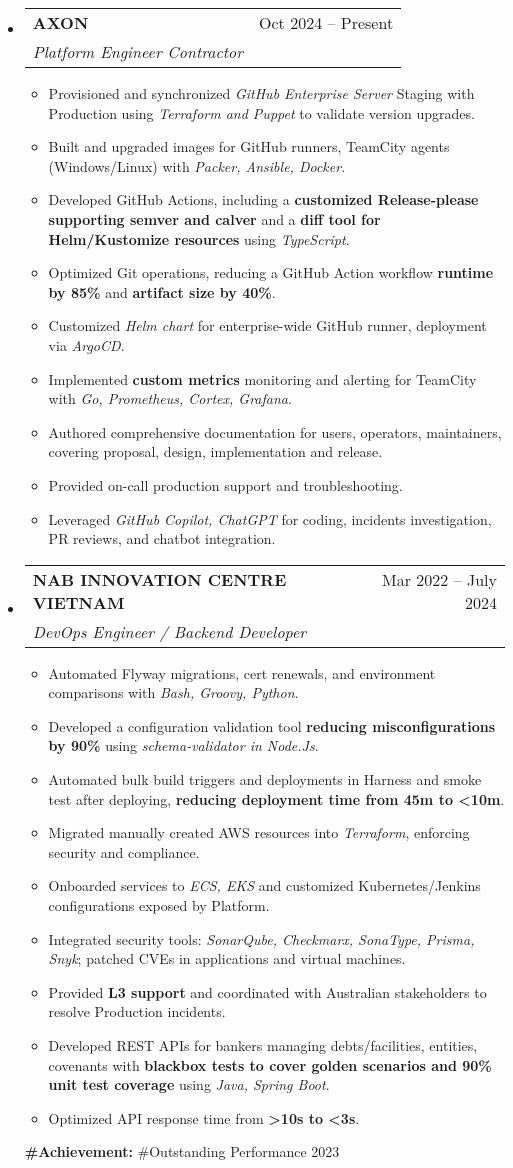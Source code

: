 \documentclass[letterpaper,12pt]{article}[leftmargin=*]
\makeatletter
\def \entryspacing {5pt}
\newcommand{\resumeEntryStart}{\begin{itemize}[leftmargin=2.5mm]}
\newcommand{\resumeEntryEnd}{\end{itemize}\vspace{\entryspacing}}
\newcommand{\resumeItemListStart}{\begin{itemize}[leftmargin=4.5mm]}
\newcommand{\resumeItemListEnd}{\end{itemize}}
\newcommand{\resumeItem}[1]{
  \item\small{
    {#1 \vspace{-2pt}}
  }
}
\newcommand{\resumeEntryTSDL}[4]{
  \vspace{-1pt}\item[]
    \begin{tabularx}{0.97\textwidth}{X@{\hspace{60pt}}r}
      \textbf{\color{primary}#1} & {\firabook\color{accent}\small#2} \\
      \textit{\color{accent}\small#3} & {\firabook\color{accent}\small#4} \\
    \end{tabularx}\vspace{-6pt}
}
\makeatother
\begin{document}
  \resumeEntryStart
    \resumeEntryTSDL
      {AXON}{Oct 2024 -- Present}
      {Platform Engineer Contractor}{}
    \resumeItemListStart
      \resumeItem {Provisioned and synchronized \textit{GitHub Enterprise Server} Staging with Production using \textit{Terraform and Puppet} to validate version upgrades.}
      \resumeItem {Built and upgraded images for GitHub runners, TeamCity agents (Windows/Linux) with \textit{Packer, Ansible, Docker}.}
      \resumeItem {Developed GitHub Actions, including a \textbf{customized Release-please supporting semver and calver} and a \textbf{diff tool for Helm/Kustomize resources} using \textit{TypeScript}.}
      \resumeItem {Optimized Git operations, reducing a GitHub Action workflow \textbf{runtime by 85\%} and \textbf{artifact size by 40\%}.}
      \resumeItem {Customized \textit{Helm chart} for enterprise-wide GitHub runner, deployment via \textit{ArgoCD}.}
      \resumeItem {Implemented \textbf{custom metrics} monitoring and alerting for TeamCity with \textit{Go, Prometheus, Cortex, Grafana}.}
      \resumeItem {Authored comprehensive documentation for users, operators, maintainers, covering proposal, design, implementation and release.}
      \resumeItem {Provided on-call production support and troubleshooting.}
      \resumeItem {Leveraged \textit{GitHub Copilot, ChatGPT} for coding, incidents investigation, PR reviews, and chatbot integration.}
    \resumeItemListEnd
  \resumeEntryEnd

  \resumeEntryStart
    \resumeEntryTSDL
      {NAB INNOVATION CENTRE VIETNAM}{Mar 2022 -- July 2024}
      {DevOps Engineer / Backend Developer}{}
    \resumeItemListStart
      \resumeItem {Automated Flyway migrations, cert renewals, and environment comparisons with \textit{Bash, Groovy, Python}.}
      \resumeItem {Developed a configuration validation tool \textbf{reducing misconfigurations by 90\%} using \textit{schema-validator in Node.Js}.}
      \resumeItem {Automated bulk build triggers and deployments in Harness and smoke test after deploying, \textbf{reducing deployment time from 45m to <10m}.}
      \resumeItem {Migrated manually created AWS resources into \textit{Terraform}, enforcing security and compliance.}
      \resumeItem {Onboarded services to \textit{ECS, EKS} and customized Kubernetes/Jenkins configurations exposed by Platform.}
      \resumeItem {Integrated security tools: \textit{SonarQube, Checkmarx, SonaType, Prisma, Snyk}; patched CVEs in applications and virtual machines.}

      \newpage
      \resumeItem {Provided \textbf{L3 support} and coordinated with Australian stakeholders to resolve Production incidents.}
      \resumeItem {Developed REST APIs for bankers managing debts/facilities, entities, covenants with \textbf{blackbox tests to cover golden scenarios and 90\% unit test coverage} using \textit{Java, Spring Boot}.}
      \resumeItem {Optimized API response time from \textbf{>10s to <3s}.}
    \resumeItemListEnd
    \textbf{\color{primary}\small#Achievement: }{\small#Outstanding Performance 2023}
  \resumeEntryEnd
\end{document}
